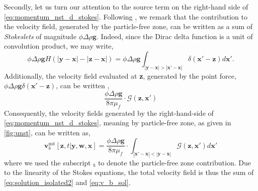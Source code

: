 Secondly, let us turn our attention to the source term on the right-hand side of \ref{eq:momentum_nst_d_stokes}. 
Following \citet{zhang2021ensemble}, we remark that the contribution to the velocity field, generated by the particle-free zone, can be written as a sum of \textit{Stokeslets} of magnitude $\phi\Delta \rho \textbf{g}$.
Indeed, since the Dirac delta function is a unit of convolution product, we may write, 
\begin{equation}
    \phi \Delta\rho  \textbf{g} H(|\textbf{y} - \textbf{x}| - |\textbf{z} - \textbf{x}|)
    = 
    \phi \Delta\rho  \textbf{g} 
    \int_{|\textbf{y} - \textbf{x}| > |\textbf{x}' - \textbf{x}|}
    \delta(\textbf{x}'-\textbf{z})
    d\textbf{x}'. 
\end{equation}
Additionally, the velocity field evaluated at \textbf{z}, generated by the point force,  $\phi\Delta \rho \textbf{g}\delta(\textbf{x}' - \textbf{z})$, can be written \citep{pozrikidis1992boundary}, 
\begin{equation}
    \frac{\phi\Delta \rho \textbf{g}}{8\pi \mu_f}\cdot \mathcal{G}(\textbf{z},\textbf{x}')
\end{equation}
Consequently, the velocity fields generated by the right-hand-side of \ref{eq:momentum_nst_d_stokes}, meaning by particle-free zone, as given in \ref{fig:unst}, can be written as, 
\begin{equation}
    \textbf{v}_b^\text{nst}[\textbf{z},t|\textbf{y},\textbf{w},\textbf{x}]
    = 
    \frac{\phi\Delta \rho \textbf{g}}{8\pi \mu_f}\cdot 
    \int_{|\textbf{x}'-\textbf{x}|< |\textbf{y}- \textbf{x}|}
    \mathcal{G}(\textbf{z},\textbf{x}')
    d\textbf{x}'
    \label{eq:v_b_sol}
\end{equation}
where we used the subscript $_b$ to denote the particle-free zone contribution. 
Due to the linearity of the Stokes equations, the total velocity field is thus the sum of \ref{eq:solution_isolated2} and \ref{eq:v_b_sol}. 

